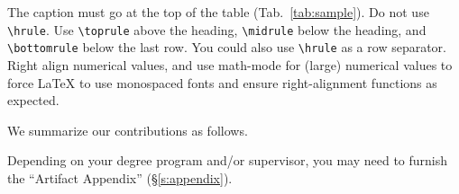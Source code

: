 %
The caption must go at the top of the table (Tab.~\ref{tab:sample}).
%
Do not use \texttt{\textbackslash{}hrule}.
%
Use \texttt{\textbackslash{}toprule} above the heading,
\texttt{\textbackslash{}midrule} below the heading, and
\texttt{\textbackslash{}bottomrule} below the last row.
%
You could also use \texttt{\textbackslash{}hrule} as a row separator.
%
Right align numerical values, and use math-mode for (large) numerical values to
force \LaTeX{} to use monospaced fonts and ensure right-alignment functions as
expected.

\textcolor{lightgray}{\lipsum[12-14]}

We summarize our contributions as follows.

\case{}
%
\textcolor{lightgray}{\lipsum[10][2-4]}

\case{}
% 
\textcolor{lightgray}{\lipsum[11][4-8]}

\case{}
% 
\textcolor{lightgray}{\lipsum[12][2-6]}

\case{}
% 
\textcolor{lightgray}{\lipsum[16][4-8]}

Depending on your degree program and/or supervisor, you may need to furnish the
“Artifact Appendix” (\S\ref{s:appendix}).


